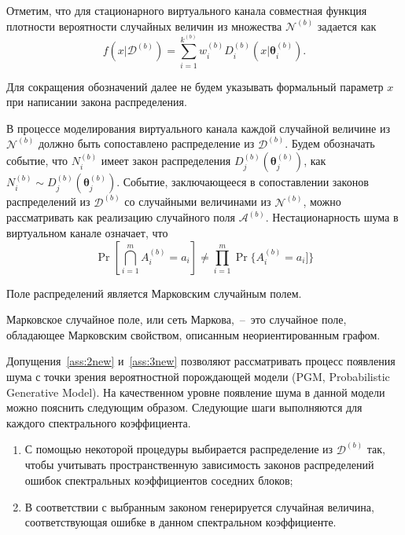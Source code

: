 Отметим, что для стационарного виртуального канала совместная функция плотности вероятности случайных величин из множества $\mathcal{N}^{(b)}$ задается как
\begin{equation}
f(x \vert \mathcal{D}^{(b)}) = \sum\limits_{i=1}^{k^{(b)}} w_i^{(b)} D_i^{(b)}(x \vert \boldsymbol{\theta}_i^{(b)}).
\label{eq:GeneralMM}
\end{equation}

Для сокращения обозначений далее не будем указывать формальный параметр $x$ при написании закона распределения.

В процессе моделирования виртуального канала каждой случайной величине из $\mathcal{N}^{(b)}$ должно быть сопоставлено распределение из $\mathcal{D}^{(b)}$. Будем обозначать событие, что $N_i^{(b)}$ имеет закон распределения $D_j^{(b)}(\boldsymbol{\theta}_j^{(b)})$, как $N_i^{(b)} \sim D_j^{(b)}(\boldsymbol{\theta}_j^{(b)})$. Событие, заключающееся в сопоставлении законов распределений из $\mathcal{D}^{(b)}$ со случайными величинами из $\mathcal{N}^{(b)}$, можно рассматривать как реализацию случайного поля $\mathcal{A}^{(b)}$. Нестационарность шума в виртуальном канале означает, что
\begin{equation*}
\Pr \left[ \bigcap\limits_{i=1}^{m} A_i^{(b)}=a_i \right] \neq 
\prod\limits_{i=1}^{m} \Pr \{ A_i^{(b)}=a_i ] \}
\end{equation*}

\begin{assumptionext}
    Поле распределений является Марковским случайным полем.
\label{ass:3new}
\end{assumptionext}

\begin{definition}
    Марковское случайное поле, или сеть Маркова,~--~это случайное поле, обладающее Марковским свойством, описанным неориентированным графом.
\end{definition}

Допущения~\ref{ass:2new} и~\ref{ass:3new} позволяют рассматривать процесс появления шума с точки зрения вероятностной порождающей модели (PGM, Probabilistic Generative Model). На качественном уровне появление шума в данной модели можно пояснить следующим образом. Следующие шаги выполняются для каждого спектрального коэффициента.
\begin{enumerate}
  \item С помощью некоторой процедуры выбирается распределение из $\mathcal{D}^{(b)}$ так, чтобы учитывать пространственную зависимость законов распределений ошибок спектральных коэффициентов соседних блоков;
  \item В соответствии с выбранным законом генерируется случайная величина, соответствующая ошибке в данном спектральном коэффициенте.
\end{enumerate}

